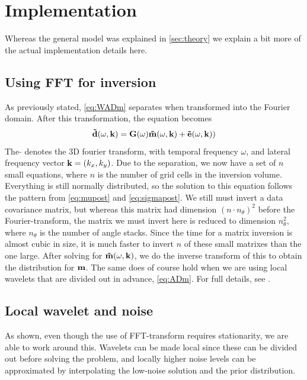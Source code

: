\chapter{Implementation}
\label{sec:implementation}

Whereas the general model was explained in \autoref{sec:theory} we explain a bit more of the actual implementation details here.

\section{Using FFT for inversion}
As previously stated, \autoref{eq:WADm} separates when transformed into the Fourier domain. After this transformation, the equation becomes
\begin{equation}
\label{eq:fourierinv}
\mathbf{\tilde{d}}(\omega,\mathbf{k}) = \mathbf{G}(\omega)\mathbf{\tilde{m}}(\omega,\mathbf{k}) + \mathbf{\tilde{e}}(\omega,\mathbf{k}))
\end{equation}
The $\tilde{ }$ denotes the 3D fourier transform, with temporal frequency $\omega$, and lateral frequency vector $\mathbf{k} = (k_x,k_y)$. Due to the separation, we now have a set of $n$ small equations, where $n$ is the number of grid cells in the inversion volume. Everything is still normally distributed, so the solution to this equation follows the pattern from \autoref{eq:mupost} and \autoref{eq:sigmapost}. We still must invert a data covariance matrix, but whereas this matrix had dimension $(n\cdot n_\theta)^2$ before the Fourier-transform, the matrix we must invert here is reduced to dimension $n_\theta^2$, where $n_\theta$ is the number of angle stacks. Since the time for a matrix inversion is almost cubic in size, it is much faster to invert $n$ of these small matrixes than the one large. After solving for $\mathbf{\tilde{m}}(\omega,\mathbf{k})$, we do the inverse transform of this to obtain the distribution for $\mathbf{m}$. The same does of course hold when we are using local wavelets that are divided out in advance, \autoref{eq:ADm}. For full details, see \cite{geo68ab2}.

\section{Local wavelet and noise}
\label{sec:nonstationaryimp}
As shown, even though the use of FFT-transform requires stationarity,
we are able to work around this. Wavelets can be made local since
these can be divided out before solving the problem, and locally
higher noise levels can be approximated by interpolating the low-noise
solution and the prior distribution. 

